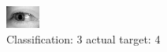 \begin{figure}[h!]
\begin{center}
\includegraphics[width=0.60\columnwidth]{figures/ID3193_class_3_target_4.png}
\end{center}
\caption{ Classification: 3 actual target: 4}
\label{fig:ID3193_class_3_target_4}
\end{figure}
